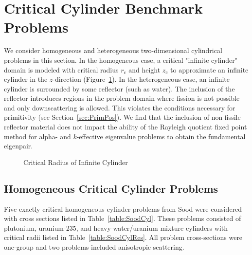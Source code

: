 \section{Critical Cylinder Benchmark Problems}

We consider homogeneous and heterogeneous two-dimensional cylindrical problems in this section. In the homogeneous case, a critical "infinite cylinder" domain is modeled with critical radius $r_{c}$ and height $z_{c}$ to approximate an infinite cylinder in the $z$-direction (Figure~\ref{fig:CylCritRadius}). In the heterogeneous case, an infinite cylinder is surrounded by some reflector (such as water). The inclusion of the reflector introduces regions in the problem domain where fission is not possible and only downscattering is allowed. This violates the conditions necessary for primitivity (see Section~\ref{sec:PrimPos}). We find that the inclusion of non-fissile reflector material does not impact the ability of the Rayleigh quotient fixed point method for alpha- and $k$-effective eigenvalue problems to obtain the fundamental eigenpair.

\begin{figure}[!htbp]
	\centering
	
	\caption{Critical Radius of Infinite Cylinder}
	\label{fig:CylCritRadius}
\end{figure}

\subsection{Homogeneous Critical Cylinder Problems}

Five exactly critical homogeneous cylinder problems from Sood \cite{sood2003analytical} were considered with cross sections listed in Table~\ref{table:SoodCyl}. These problems consisted of plutonium, uranium-235, and heavy-water/uranium mixture cylinders with critical radii listed in Table~\ref{table:SoodCylRes}. All problem cross-sections were one-group and two problems included anisotropic scattering.

